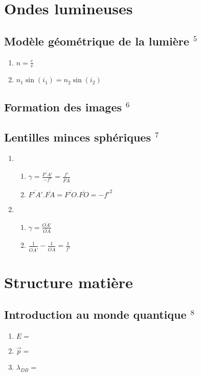 \documentclass[fleqn]{article}
\theoremstyle{definition} \newtheorem*{defi}{D\'efinition}
\theoremstyle{definition} \newtheorem*{theo}{Th\'eor\`eme}
\theoremstyle{definition} \newtheorem*{coro}{Corollaire}
\theoremstyle{remark} \newtheorem*{rqs}{Remarques}
\theoremstyle{definition} \newtheorem*{prop}{Propri\'et\'e}
\begin{document}
\newpage

\section{Ondes lumineuses}
\subsection{Mod\`ele g\'eom\'etrique de la lumi\`ere $^5$}
\begin{enumerate}
	\item $n = \frac{c}{v}$
	\item $n_1 \sin(i_1) = n_2 \sin(i_2)$
\end{enumerate}

\subsection{Formation des images $^6$}

\subsection{Lentilles minces sph\'eriques $^7$}
\begin{enumerate}
	\item
		\begin{enumerate}
			\item $\gamma = \frac{\overline{F'A'}}{-f'} = \frac{f'}{\overline{FA}}$
			\item $\overline{F'A'}.\overline{FA} = \overline{F'O}.\overline{FO} = -f'^2$
		\end{enumerate}
	\item
		\begin{enumerate}
			\item $\gamma = \frac{\overline{OA'}}{\overline{OA}}$
			\item $\frac{1}{\overline{OA'}} - \frac{1}{\overline{OA}} = \frac{1}{f'}$
		\end{enumerate}
\end{enumerate}


\newpage

\section{Structure mati\`ere}
\subsection{Introduction au monde quantique $^8$}
\begin{enumerate}
	\item $E = $
	\item $\vec{p} = $
	\item $\lambda_{DB} = $
\end{enumerate}
\end{document}
